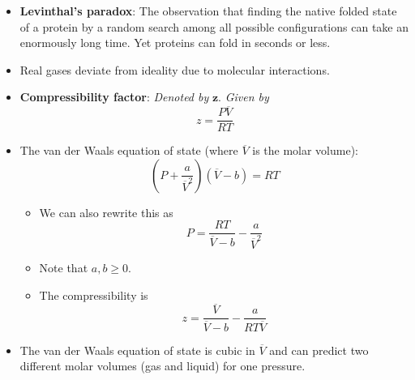 \documentclass[../notes.tex]{subfiles}
\begin{document}
\begin{itemize}
\begin{itemize}
    \end{itemize}
    \item \textbf{Levinthal's paradox}: The observation that finding the native folded state of a protein by a random search among all possible configurations can take an enormously long time. Yet proteins can fold in seconds or less.
    \item Real gases deviate from ideality due to molecular interactions.
    \item \textbf{Compressibility factor}: \emph{Denoted by} $\bm{z}$. \emph{Given by}
    \begin{equation*}
        z = \frac{P\overline{V}}{RT}
    \end{equation*}
    \item The van der Waals equation of state (where $\overline{V}$ is the molar volume):
    \begin{equation*}
        \left( P+\frac{a}{\overline{V}^2} \right)(\overline{V}-b) = RT
    \end{equation*}
    \begin{itemize}
        \item We can also rewrite this as
        \begin{equation*}
            P = \frac{RT}{\overline{V}-b}-\frac{a}{\overline{V}^2}
        \end{equation*}
        \item Note that $a,b\geq 0$.
        \item The compressibility is
        \begin{equation*}
            z = \frac{\overline{V}}{\overline{V}-b}-\frac{a}{RT\overline{V}}
        \end{equation*}
    \end{itemize}
    \item The van der Waals equation of state is cubic in $\overline{V}$ and can predict two different molar volumes (gas and liquid) for one pressure.
    \begin{figure}[h!]
        \centering
\end{figure}
\end{itemize}
\end{document}
